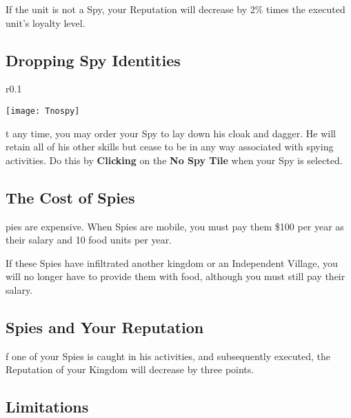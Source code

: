 If the unit is not a Spy, your Reputation will decrease by 2\% times the executed unit’s loyalty level.

\subsection{\textsf{Dropping Spy Identities}}


\begin{wrapfigure}{r}{0.1\textwidth}
    \vspace{-20pt}
    \begin{center}
        \texttt{[image: Tnospy]}
    \end{center}
    \vspace{-20pt}
\end{wrapfigure}

t any time, you may order your Spy to lay down his cloak and dagger. He will retain all of his other skills but cease to be in any way associated with spying activities. Do this by \textbf{Clicking} on the \textbf{No Spy Tile} when your Spy is selected.

\subsection{\textsf{The Cost of Spies}}


pies are expensive. When Spies are mobile, you must pay them \$100 per year as their salary and 10 food units per year.

If these Spies have infiltrated another kingdom or an Independent Village, you will no longer have to provide them with food, although you must still pay their salary.

\subsection{\textsf{Spies and Your Reputation}}


f one of your Spies is caught in his activities, and subsequently executed, the Reputation of your Kingdom will decrease by three points.

\subsection{\textsf{Limitations}}

